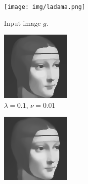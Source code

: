 \documentclass{scrreprt}
\begin{document}
            \begin{figure}[!ht]
                \centering
                \begin{subfigure}[b]{0.32\textwidth}
                    \texttt{[image: img/ladama.png]}
                    \caption{Input image $g$.}
                \end{subfigure}
                \begin{subfigure}[b]{0.32\textwidth}
                    \includegraphics[width=\textwidth]{img/dykstra/ladama.png}
                    \caption{$\lambda = 0.1$, $\nu = 0.01$}
                \end{subfigure}
                \begin{subfigure}[b]{0.32\textwidth}
                    \includegraphics[width=\textwidth]{img/lagrange/ladama.png}

\end{subfigure}
\end{figure}
\end{document}
